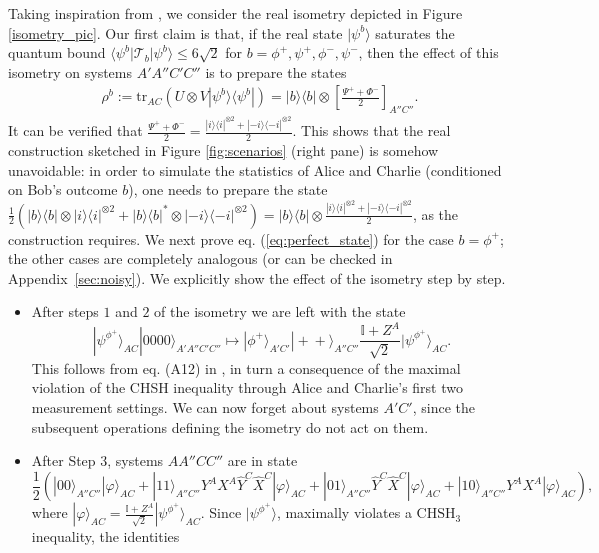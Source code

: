 \documentclass[onecolumn,prx,amsmath,amssymb,12pt]{revtex4-2}
\def\bra#1{\langle#1|} \def\ket#1{|#1\rangle}
\def\ketbra#1#2{\ket{#1}\!\bra{#2}}
\def\proj#1{\ket{#1}\!\bra{#1}}
\def\id{{\mathbb I}}
\def\tr{\mbox{tr}}
\begin{document}
\begin{appendix}
Taking inspiration from \cite{self_testing}, we consider the real isometry depicted in Figure \ref{isometry_pic}. Our first claim is that, if the real state $\ket{\psi^b}$ saturates the quantum bound $\bra{\psi^b}\mathscr{T}_b\ket{\psi^b}\leq 6\sqrt{2}$ for $b=\phi^+,\psi^+,\phi^-,\psi^-$, then the effect of this isometry on systems $A'A''C'C''$ is to prepare the states 
\begin{align} \label{eq:perfect_state}
\rho^b:= \tr_{AC}({U}\otimes {V} \ketbra{\psi^b}{\psi^b})=\ketbra{b}{b}\otimes\left[\frac{\Psi^++\Phi^-}{2}\right]_{A''C''}.
\end{align}
It can be verified that $\frac{\Psi^+ +\Phi^-}{2}=\frac{\proj{i}^{\otimes 2}+\proj{-i}^{\otimes 2}}{2}$. This shows that the real construction sketched in Figure \ref{fig:scenarios} (right pane) is somehow unavoidable: in order to simulate the statistics of Alice and Charlie (conditioned on Bob's outcome $b$), one needs to prepare the state $\frac{1}{2}(\proj{b}\otimes \proj{i}^{\otimes 2}+\proj{b}^*\otimes \proj{-i}^{\otimes 2})=\proj{b}\otimes \frac{\proj{i}^{\otimes 2}+\proj{-i}^{\otimes 2}}{2}$, as the construction requires.
We next prove eq. (\ref{eq:perfect_state}) for the case $b= \phi^+$; the other cases are completely analogous (or can be checked in Appendix~\ref{sec:noisy}). We explicitly show the effect of the isometry step by step. 
\begin{itemize}
\item After steps $1$ and $2$ of the isometry we are left with the state
\[
\ket{\psi^{\phi^+}}_{AC} \ket{0000}_{A'A''C'C''} \mapsto \ket{\phi^+}_{A'C'} \ket{+\!+}_{A''C''} \frac{\id + Z^A}{\sqrt{2}} \ket{\psi^{\phi^+}}_{{AC}}. 
\]
This follows from eq. (A12) in \cite{self_testing}, in turn a consequence of the maximal violation of the CHSH inequality through Alice and Charlie's first two measurement settings. We can now forget about systems $A'C'$, since the subsequent operations defining the isometry do not act on them. 

\item After Step $3$, systems ${A}A''{C}C''$ are in state
\begin{equation} \label{eq: middle state}
\frac{1}{2}(\ket{00}_{A''C''} \ket{\varphi}_{{AC}} + \ket{11}_{A''C''} Y^AX^A\hat{Y}^C \hat{X}^C \ket{\varphi}_{{AC}} + \ket{01}_{A''C''} \hat{Y}^C \hat{X}^C \ket{\varphi}_{{AC}}+\ket{10}_{A''C''} Y^AX^A \ket{\varphi}_{{AC}}),
\end{equation}
where $\ket{\varphi}_{{AC}}= \frac{\id+Z^A}{\sqrt{2}}\ket{\psi^{\phi^+}}_{{AC}}$. 
Since $\ket{\psi^{\phi^+}}$, maximally violates a $\text{CHSH}_3$ inequality, the identities 


\end{itemize}
\end{appendix}
\end{document}
